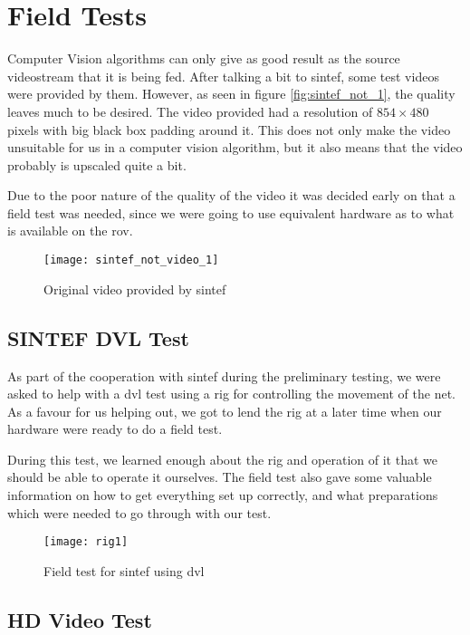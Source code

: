 
\chapter{Field Tests}\label{ch:field_test}

Computer Vision algorithms can only give as good result as the source videostream that it is 
being fed. After talking a bit to \gls{sintef}, some test videos were provided by them. However, as seen in figure 
\vref{fig:sintef_not_1}, the quality leaves much to be desired. The video provided had a resolution 
of $854 \times 480$ pixels with big black box padding around it. This does not only make 
the video unsuitable for us in a computer vision algorithm, but it also means that the video 
probably is upscaled quite a bit.

Due to the poor nature of the quality of the video it was decided early on that 
a field test was needed, since we were going to use equivalent hardware as to what is available on the \gls{rov}. 

\begin{figure}[htbp]
	\centering
	\texttt{[image: sintef\_not\_video\_1]}
	\caption{Original video provided by \gls{sintef}}
	\label{fig:sintef_not_1}
\end{figure}

\section{SINTEF DVL Test}
As part of the cooperation with \gls{sintef} during the preliminary testing, we 
were asked to help with a \gls{dvl} test using a rig for controlling 
the movement of the net. As a favour for us helping out, we 
got to lend the rig at a later time when our hardware were ready to do a field test. 

During this test, we learned enough about the rig and operation of it that we should be able to operate 
it ourselves. The field test also gave some valuable information 
on how to get everything set up correctly, and what preparations which 
were needed to go through with our test.

\begin{figure}[htbp]
	\centering
	\texttt{[image: rig1]}
	\caption{Field test for \gls{sintef} using \gls{dvl}}
	\label{fig:test_dvl}
\end{figure}

\section{HD Video Test}

